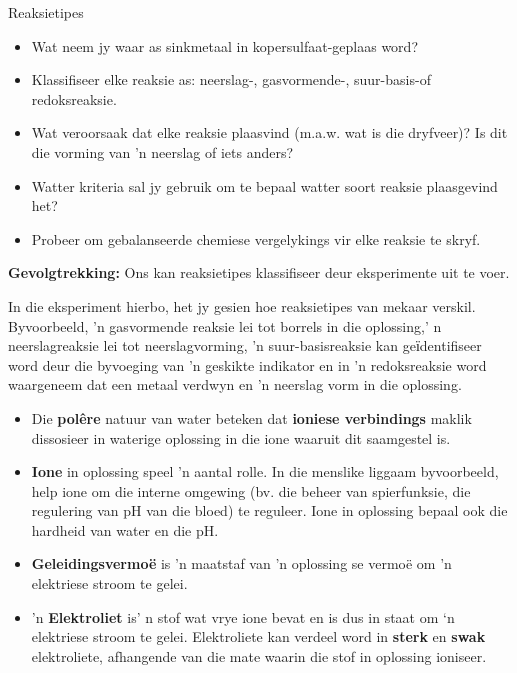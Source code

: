 {{\begin{g_experiment}{Reaksietipes}
\begin{itemize}[noitemsep]
\item Wat neem jy waar as sinkmetaal in kopersulfaat-geplaas word?
\item Klassifiseer elke reaksie as: neerslag-, gasvormende-, suur-basis-of redoksreaksie.
\item Wat veroorsaak dat elke reaksie plaasvind (m.a.w. wat is die dryfveer)? Is dit die vorming van 'n neerslag of iets anders?
\item Watter kriteria sal jy gebruik om te bepaal watter soort reaksie plaasgevind het?
\item Probeer om gebalanseerde chemiese vergelykings vir elke reaksie te skryf.
\end{itemize}
        \par 
\label{m38719*eip-1904}\noindent{}\textbf{Gevolgtrekking: }\newline
Ons kan reaksietipes klassifiseer deur eksperimente uit te voer.
\par 
\end{g_experiment}
In die eksperiment hierbo, het jy gesien hoe reaksietipes van mekaar verskil. Byvoorbeeld, 'n gasvormende reaksie lei tot borrels in die oplossing,' n neerslagreaksie lei tot  neerslagvorming, 'n suur-basisreaksie kan geїdentifiseer word deur die byvoeging van 'n  geskikte indikator en in 'n redoksreaksie word waargeneem dat een metaal verdwyn en 'n neerslag vorm in die oplossing.\par  
\label{m38719*eip-796}
            \nopagebreak
            \label{m38719*eip-903}\begin{itemize}[noitemsep]
            \label{m38719*uid95}\item Die \textbf{pol\^{e}re} natuur van water beteken dat \textbf{ioniese verbindings} maklik dissosieer in waterige oplossing in die ione waaruit dit saamgestel is. 
\label{m38719*uid96}\item \textbf{Ione} in oplossing speel 'n aantal rolle. In die menslike liggaam byvoorbeeld, help ione om die interne omgewing (bv. die beheer van spierfunksie, die regulering van pH van die bloed) te reguleer. Ione in oplossing bepaal ook die hardheid van water en die pH. 
\label{m38719*uid100}\item \textbf{Geleidingsvermo\"{e}} is 'n maatstaf van 'n oplossing se vermoë om 'n elektriese stroom te gelei.
\label{m38719*uid101}\item 'n \textbf{Elektroliet} is' n stof wat vrye ione bevat en is dus in staat om ‘n elektriese stroom te gelei. Elektroliete kan verdeel word in \textbf{sterk} en \textbf{swak} elektroliete, afhangende van die mate waarin die stof in oplossing ioniseer.

\end{itemize}}}
